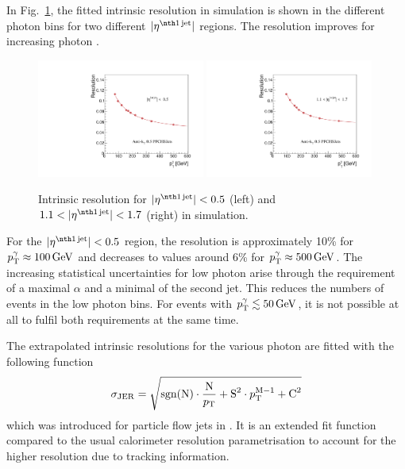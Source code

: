 In Fig.~\ref{fig:ResolutionOfPtgamma}, the fitted intrinsic resolution in simulation is shown in the different photon \pt bins for two different $|\etafirstjet|$ regions.
The resolution improves for increasing photon \pt. 
\begin{figure}[tbp]
  \centering
    \includegraphics[width=0.49\textwidth]{figures/resolution/methodology/Resolution_for_1_eta_bin_PFCHS_mc_RMS99.pdf}
    \includegraphics[width=0.49\textwidth]{figures/resolution/methodology/Resolution_for_3_eta_bin_PFCHS_mc_RMS99.pdf}
  \caption{Intrinsic resolution for $|\etafirstjet| < 0.5$ (left) and $1.1<|\etafirstjet| < 1.7$ (right) in simulation.}  
  \label{fig:ResolutionOfPtgamma}
\end{figure}
For the $|\etafirstjet|<0.5$ region, the resolution is approximately 10\% for $p_{\text{T}}^{\gamma} \approx 100\,\text{Ge}\kern-0.06667em\text{V}$ and decreases to values around 6\% for  
$p_{\text{T}}^{\gamma} \approx 500\,\text{Ge}\kern-0.06667em\text{V}$.
The increasing statistical uncertainties for low photon \pt arise through the requirement of a maximal $\alpha$ and a minimal \pt of the second jet. 
This reduces the numbers of events in the low photon \pt bins. 
For events with ${p}_\mathrm{T}^{\gamma} \lesssim 50\,\text{Ge}\kern-0.06667em\text{V}$, it is not possible at all to fulfil both requirements at the same time.

The extrapolated intrinsic resolutions for the various photon \pt are fitted with the following function
\begin{equation}
\label{eq:PFresolution}
\sigma_\mathrm{JER} = \sqrt{\text{sgn(N)} \cdot \frac{\text{N}}{p_{\text{T}}}  + \text{S}^2 \cdot p_{\text{T}}^{\text{M}-1} +  \text{C}^2 }
\end{equation}
which was introduced for particle flow jets in \cite{bib:CMS:JERCPaper_2011}.
It is an extended fit function compared to the usual calorimeter resolution parametrisation to account for the higher resolution due to tracking information. 

